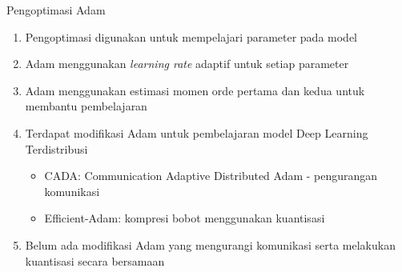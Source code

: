 \begin{frame}{Pengoptimasi Adam}
  \begin{enumerate}
    \item Pengoptimasi digunakan untuk mempelajari parameter pada model
    \item Adam \parencite{ADAMKingma} menggunakan \textit{learning rate} adaptif untuk setiap parameter
    \item Adam menggunakan estimasi momen orde pertama dan kedua untuk membantu pembelajaran
    \item Terdapat modifikasi Adam untuk pembelajaran model Deep Learning Terdistribusi
          \begin{itemize}
            \item CADA: Communication Adaptive Distributed Adam - pengurangan komunikasi \parencite{Chen2021CADA}
            \item Efficient-Adam: kompresi bobot menggunakan kuantisasi \parencite{Chen2022Efficient}
          \end{itemize}
    \item Belum ada modifikasi Adam yang mengurangi komunikasi serta melakukan kuantisasi secara bersamaan
  \end{enumerate}
\end{frame}
